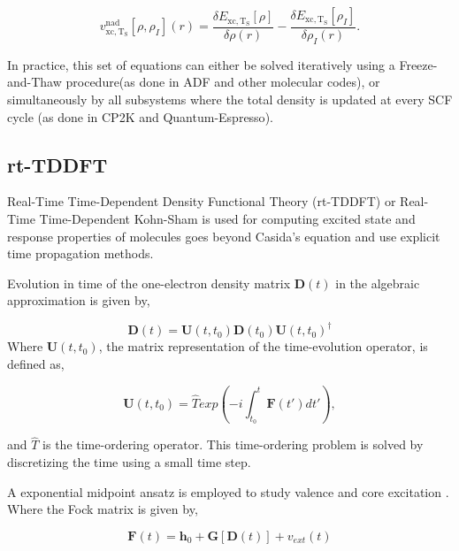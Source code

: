 \documentclass[notitlepage,12pt]{report}
\begin{document}
	\begin{equation}
		\label{emb_xct}
		v_{\mathrm{xc, T_{S}}}^{\mathrm{nad}}[\rho,\rho_{I}](r) = \frac{\delta E_{\mathrm{xc, T_{S}}}[\rho]}{\delta \rho(r)} - \frac{\delta E_{\mathrm{xc, T_{S}}}[\rho_I]}{\delta \rho_I(r)}.
	\end{equation}

	In practice, this set of equations can either be solved iteratively using  a Freeze-and-Thaw\supercite{FaT} procedure(as done in ADF\supercite{te2001chemistry} and other molecular codes), or simultaneously by all subsystems where the total density is updated at every SCF cycle (as done in CP2K \supercite{hutter2014cp2k} and Quantum-Espresso\supercite{RN48,mi2021eqe}).

\subsection{rt-TDDFT}
	Real-Time Time-Dependent Density Functional Theory (rt-TDDFT) or Real-Time Time-Dependent Kohn-Sham is used for computing excited state and response properties of molecules goes beyond Casida's equation \supercite{casida1995recent} and use explicit time propagation methods\supercite{goings2018real}.
	
	Evolution in time of the one-electron density matrix $\textbf{D}(t)$ in the algebraic approximation is given by,
	
	\begin{equation}
		\textbf{D}(t) = \textbf{U}(t,t_0)\textbf{D}(t_0)\textbf{U}(t,t_0)^{\dagger}
	\end{equation}
 	Where $\textbf{U}(t,t_0)$, the matrix representation of the time-evolution operator, is defined as,
 	
 	\begin{equation}
 		\textbf{U}(t,t_0)= \hat{T} exp \left( -i \int_{t_0}^{t} \textbf{F}(t')dt' \right),
 	\end{equation}
 	
 	and $\hat{T}$ is the time-ordering operator. This time-ordering problem is solved by discretizing the time using a small time step\supercite{de2020pyberthart}. 
 	
 	A exponential midpoint ansatz is employed to study valence and core excitation \supercite{de2021environment}. Where the Fock matrix is given by,
 	
 	\begin{equation}
 		\textbf{F}(t)=\textbf{h}_0+\textbf{G}[\textbf{D}(t)]+v_{ext}(t)
 	\end{equation}
 	
\end{document}
